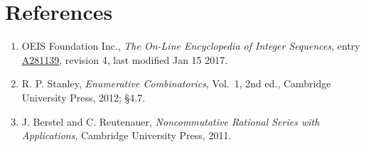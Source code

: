 \documentclass[11pt]{article}
\theoremstyle{definition}
\begin{document}
\section{References}

\begin{enumerate}

\item OEIS Foundation Inc., \emph{The On-Line Encyclopedia of Integer Sequences}, entry \href{https://oeis.org/A281139}{A281139}, revision 4, last modified Jan 15 2017.

\item R. P. Stanley, \emph{Enumerative Combinatorics}, Vol.~1, 2nd ed., Cambridge University Press, 2012; \S4.7.

\item J. Berstel and C. Reutenauer, \emph{Noncommutative Rational Series with Applications}, Cambridge University Press, 2011.

\end{enumerate}
\end{document}
